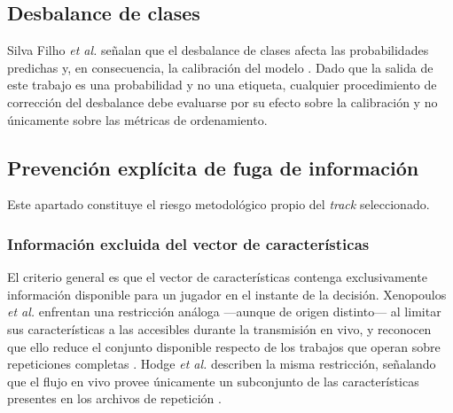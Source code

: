 \subsection{Desbalance de clases}
\label{subsec:desbalance}



Silva Filho \textit{et al.} señalan que el desbalance de clases afecta las
probabilidades predichas y, en consecuencia, la calibración del modelo
\cite{silvafilho_calibration_2023}. Dado que la salida de este trabajo es
una probabilidad y no una etiqueta, cualquier procedimiento de corrección
del desbalance debe evaluarse por su efecto sobre la calibración y no
únicamente sobre las métricas de ordenamiento.


\subsection{Prevención explícita de fuga de información}
\label{subsec:leakage}

Este apartado constituye el riesgo metodológico propio del \textit{track}
seleccionado.

\subsubsection{Información excluida del vector de características}


El criterio general es que el vector de características contenga
exclusivamente información disponible para un jugador en el instante de la
decisión. Xenopoulos \textit{et al.} enfrentan una restricción análoga
---aunque de origen distinto--- al limitar sus características a las
accesibles durante la transmisión en vivo, y reconocen que ello reduce el
conjunto disponible respecto de los trabajos que operan sobre repeticiones
completas \cite{xenopoulos_winprob_2022}. Hodge \textit{et al.} describen
la misma restricción, señalando que el flujo en vivo provee únicamente un
subconjunto de las características presentes en los archivos de repetición
\cite{hodge_winprediction_2021}.

